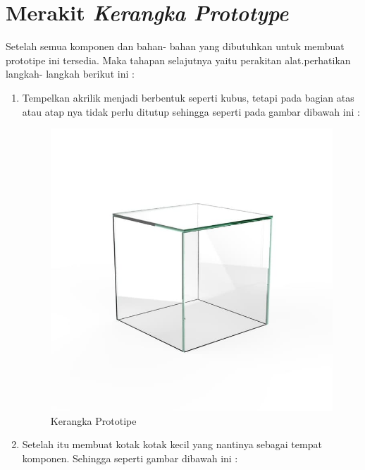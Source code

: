 \section{Merakit \textit{Kerangka Prototype}}
\par Setelah semua komponen dan bahan- bahan yang dibutuhkan untuk membuat prototipe ini tersedia. Maka tahapan selajutnya yaitu perakitan alat.perhatikan langkah- langkah berikut ini :
\begin{enumerate}
    \item Tempelkan akrilik menjadi berbentuk seperti kubus, tetapi pada bagian atas atau atap nya tidak perlu ditutup sehingga seperti pada gambar dibawah ini : 
    

\begin{figure}[H]
\centering
\includegraphics[width=1\textwidth]{figures/kubus.jpg}
\caption{Kerangka Prototipe}
\label{print}
\end{figure}

\item Setelah itu membuat kotak kotak kecil yang nantinya sebagai tempat komponen. Sehingga seperti gambar dibawah ini :



\end{enumerate}
